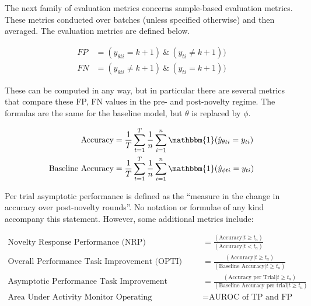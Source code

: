 \documentclass[11pt]{article}
\begin{document}
The next family of evaluation metrics concerns sample-based evaluation metrics. These metrics conducted over batches (unless specified otherwise) and then averaged. The evaluation metrics are defined below.


\begin{equation}
    \begin{aligned}
      FP &= (\hat{y}_{\theta ti} = k+1) \ \& \ (y_{ti} \neq k+1)) \\
      FN &= (\hat{y}_{\theta ti} \neq k+1) \ \& \ (y_{ti} = k+1))
    \end{aligned}
\end{equation}

These can be computed in any way, but in particular there are several metrics that compare these FP, FN values in the pre- and post-novelty regime. The formulas are the same for the baseline model, but $\theta$ is replaced by $\phi$.

\begin{equation}
    \begin{aligned}
      \text{Accuracy} &= \frac{1}{T} \sum^{T}_{t=1} \frac{1}{n} \sum^{n}_{i=1} \mathbbm{1}(\hat{y}_{\theta ti} = y_{ti}) \\
      \text{Baseline Accuracy} &= \frac{1}{T} \sum^{T}_{t=1} \frac{1}{n} \sum^{n}_{i=1} \mathbbm{1}(\hat{y}_{\phi ti} = y_{ti}) \\
    \end{aligned}
\end{equation}

Per trial asymptotic performance is defined as the ``measure in the change in accuracy over post-novelty rounds''. No notation or formulae of any kind accompany this statement. However, some additional metrics include:

\begin{equation}
    \begin{aligned}
      \text{Novelty Response Performance (NRP)} &= \frac{( \text{Accuracy} | t \geq t_a)}{( \text{Accuracy} | t < t_a)}  \\
      \text{Overall Performance Task Improvement (OPTI)} &= \frac{( \text{Accuracy} | t \geq t_a)}{( \text{Baseline Accuracy} | t \geq t_a)} \\
      \text{Asymptotic Performance Task Improvement (APTI)} &= \frac{( \text{Accuracy per Trial} | t \geq t_a)}{( \text{Baseline Accuracy per trial} | t \geq t_a)} \\
      \text{Area Under Activity Monitor Operating Characteristic (AUAMOC)} &= \text{AUROC of TP and FP}
    \end{aligned}
\end{equation}
\end{document}
